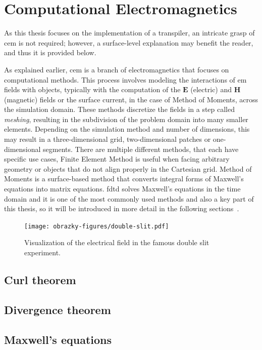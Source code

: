 \section{Computational Electromagnetics}
As this thesis focuses on the implementation of a transpiler, an intricate grasp of \gls{cem} is not required; however, a surface-level explanation may benefit the reader, and thus it is provided below.

As explained earlier, \gls{cem} is a branch of electromagnetics that focuses on computational methods. This process involves modeling the interactions of \gls{em} fields with objects, typically with the computation of the $\mathbf{E}$ (electric) and $\mathbf{H}$ (magnetic) fields or the surface current, in the case of Method of Moments, across the simulation domain. These methods discretize the fields in a step called \emph{meshing}, resulting in the subdivision of the problem domain into many smaller elements. Depending on the simulation method and number of dimensions, this may result in a three-dimensional grid, two-dimensional patches or one-dimensional segments. There are multiple different methods, that each have specific use cases, Finite Element Method is useful when facing arbitrary geometry or objects that do not align properly in the Cartesian grid. Method of Moments is a surface-based method that converts integral forms of Maxwell's equations into matrix equations. \gls{fdtd} solves Maxwell's equations in the time domain and it is one of the most commonly used methods and also a key part of this thesis, so it will be introduced in more detail in the following sections~\cite{davidson_2010}.


\begin{figure}[H]\label{fig:double-slit}
  \centering
  \texttt{[image: obrazky-figures/double-slit.pdf]}
  \caption{Visualization of the electrical field in the famous double slit experiment.}
\end{figure}




\subsection*{Curl theorem}
\subsection*{Divergence theorem}
\subsection*{Maxwell's equations}

